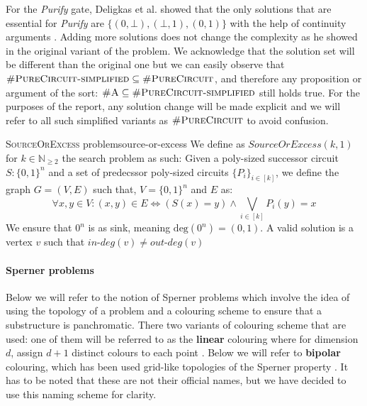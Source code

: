 For the \textit{Purify} gate,
Deligkas et al. showed that the only solutions that are essential for \textit{Purify}
are $\{(0,\bot), (\bot,1), (0,1)\}$ with the help of continuity arguments \cite{deligkas_PureCircuitTightInapproximability_2024}.
Adding more solutions does not change the complexity as he showed in the original variant of the problem.
We acknowledge that the solution set will be different than the original one but
we can easily observe that  $\textsc{\#PureCircuit-simplified} \subseteq \textsc{\#PureCircuit}$,
and therefore any proposition or argument of the sort: $\textsc{\#A} \subseteq \textsc{\#PureCircuit-simplified}$
still holds true. For the purposes of the report, any solution change will be made explicit
and we will refer to all such simplified variants as $\textsc{\#PureCircuit}$ to avoid
confusion. 



\begin{definitionbox}{\textsc{SourceOrExcess} problem}{source-or-excess}
    We define as $\textit{SourceOrExcess}(k,1)$ for $k \in \mathbb{N}_{\geq 2}$
    the search problem as such: Given a poly-sized successor circuit $S : \{0,1\}^n$
    and a set of predecssor poly-sized circuits $\{P_i\}_{i \in [k]}$, we define
    the graph $G = (V,E)$ such that, $V = \{0,1\}^n$ and $E$ as:
    $$
    \forall x, y \in V: (x,y) \in E \iff (S(x) = y) \wedge \bigvee_{i \in [k]} P_i(y) = x
    $$
    We ensure that $0^n$ is as sink, meaning $\text{deg}(0^n) = (0,1)$.
    A valid solution is a vertex $v$ such that $\textit{in-deg}(v) \neq \textit{out-deg}(v)$
\end{definitionbox}

\paragraph{Sperner problems}

Below we will refer to the notion of Sperner problems which involve
the idea of using the topology of a problem and a colouring scheme to ensure
that a substructure is panchromatic. There two variants of colouring scheme
that are used: one of them will be referred to as the \textbf{linear} colouring
where for dimension $d$, assign $d+1$ distinct colours to each point \cite{daskalakis_ComplexityComputingNash_2006, chen_Complexity2DDiscrete_2009}.
Below we will refer to \textbf{bipolar} colouring, which has been used grid-like topologies of the Sperner property
\cite{chen_SettlingComplexityComputing_2009, deligkas_PureCircuitTightInapproximability_2024, daskalakis_ComplexityConstrainedMinmax_2021}.
It has to be noted that these are not their official names, but we have decided
to use this naming scheme for clarity.



